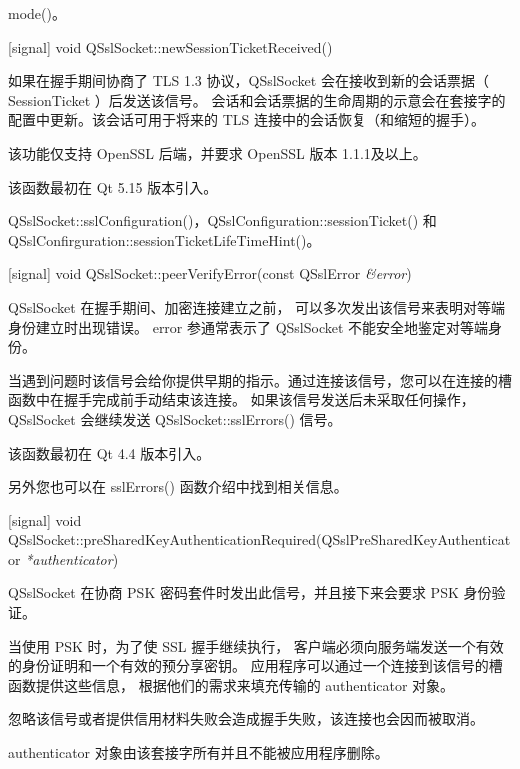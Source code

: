 \begin{seeAlso}
mode()。
\end{seeAlso}

[signal] void QSslSocket::newSessionTicketReceived()

如果在握手期间协商了 TLS 1.3 协议，QSslSocket 会在接收到新的会话票据（ SessionTicket ）后发送该信号。
会话和会话票据的生命周期的示意会在套接字的配置中更新。该会话可用于将来的 TLS 连接中的会话恢复（和缩短的握手）。

\begin{notice}
该功能仅支持 OpenSSL 后端，并要求 OpenSSL 版本 1.1.1及以上。
\end{notice}

该函数最初在 Qt 5.15 版本引入。

\begin{notice}
QSslSocket::sslConfiguration()，QSslConfiguration::sessionTicket() 和 QSslConfirguration::sessionTicketLifeTimeHint()。
\end{notice}

[signal] void QSslSocket::peerVerifyError(const QSslError \emph{\&error})

QSslSocket 在握手期间、加密连接建立之前，
可以多次发出该信号来表明对等端身份建立时出现错误。
error 参通常表示了 QSslSocket 不能安全地鉴定对等端身份。

当遇到问题时该信号会给你提供早期的指示。通过连接该信号，您可以在连接的槽函数中在握手完成前手动结束该连接。
如果该信号发送后未采取任何操作， QSslSocket 会继续发送 QSslSocket::sslErrors() 信号。

该函数最初在 Qt 4.4 版本引入。

另外您也可以在 sslErrors() 函数介绍中找到相关信息。

[signal] void QSslSocket::preSharedKeyAuthenticationRequired(QSslPreSharedKeyAuthenticator \emph{*authenticator})

QSslSocket 在协商 PSK 密码套件时发出此信号，并且接下来会要求 PSK 身份验证。

当使用 PSK 时，为了使 SSL 握手继续执行，
客户端必须向服务端发送一个有效的身份证明和一个有效的预分享密钥。
应用程序可以通过一个连接到该信号的槽函数提供这些信息，
根据他们的需求来填充传输的 authenticator 对象。

\begin{notice}
忽略该信号或者提供信用材料失败会造成握手失败，该连接也会因而被取消。
\end{notice}

\begin{notice}
authenticator 对象由该套接字所有并且不能被应用程序删除。
\end{notice}

